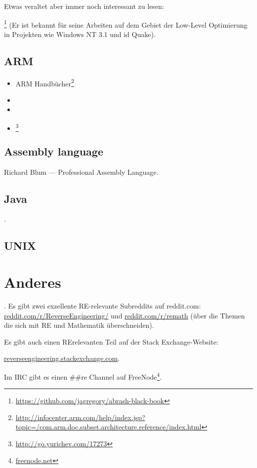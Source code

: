 Etwas veraltet aber immer noch interessant zu lesen:

\MAbrash\footnote{\AlsoAvailableAs \url{https://github.com/jagregory/abrash-black-book}}
(Er ist bekannt für seine Arbeiten auf dem Gebiet der Low-Level Optimierung in Projekten wie Windows NT 3.1 und id Quake).

\subsection{ARM}

\begin{itemize}
\item ARM Handbücher\footnote{\AlsoAvailableAs \url{http://infocenter.arm.com/help/index.jsp?topic=/com.arm.doc.subset.architecture.reference/index.html}}

\item \ARMSevenRef

\item \ARMSixFourRefURL

\item \ARMCookBook\footnote{\AlsoAvailableAs \url{http://go.yurichev.com/17273}}
\end{itemize}

\subsection{Assembly language}

Richard Blum --- Professional Assembly Language.

\subsection{Java}

\JavaBook.

\subsection{UNIX}

\TAOUP



\section{Anderes}

\HenryWarren.
Es gibt zwei exzellente \ac{RE}-relevante Subreddits auf reddit.com:
\href{http://go.yurichev.com/17027}{reddit.com/r/ReverseEngineering/} und
\href{http://go.yurichev.com/17028}{reddit.com/r/remath}
(über die Themen die sich mit \ac{RE} und Mathematik überschneiden).

Es gibt auch einen \ac{RE}relevanten Teil auf der Stack Exchange-Website:

\par \href{http://go.yurichev.com/17029}{reverseengineering.stackexchange.com}.

Im IRC gibt es einen \#\#re Channel auf
FreeNode\footnote{\href{http://go.yurichev.com/17030}{freenode.net}}.
